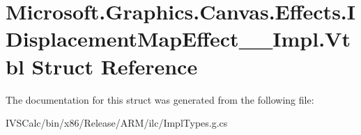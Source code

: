 \hypertarget{struct_microsoft_1_1_graphics_1_1_canvas_1_1_effects_1_1_i_displacement_map_effect_____impl_1_1_vtbl}{}\section{Microsoft.\+Graphics.\+Canvas.\+Effects.\+I\+Displacement\+Map\+Effect\+\_\+\+\_\+\+Impl.\+Vtbl Struct Reference}
\label{struct_microsoft_1_1_graphics_1_1_canvas_1_1_effects_1_1_i_displacement_map_effect_____impl_1_1_vtbl}


The documentation for this struct was generated from the following file\+:\begin{DoxyCompactItemize}
\item 
I\+V\+S\+Calc/bin/x86/\+Release/\+A\+R\+M/ilc/Impl\+Types.\+g.\+cs\end{DoxyCompactItemize}
